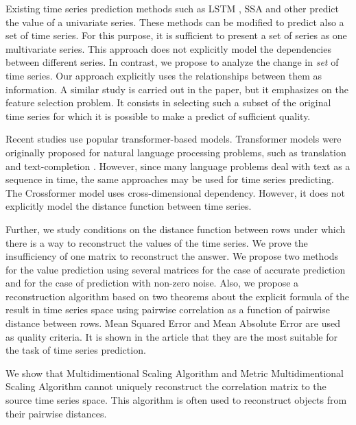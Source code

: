\documentclass[12pt]{article}
\begin{document}
	Existing time series prediction methods such as LSTM \cite{LSTM}, SSA \cite{SSA} and other \cite{Biosignals, boyd2017multiperiod} predict the value of a univariate series. These methods can be modified to predict also a set of time series. For this purpose, it is sufficient to present a set of series as one multivariate series. This approach does not explicitly model the dependencies between different series. In contrast, we propose to analyze the change in \emph{set} of time series. Our approach explicitly uses the relationships between them as information. A similar study is carried out in the \cite{MulticorrelatedQuadratic} paper, but it emphasizes on the feature selection problem. It consists in selecting such a subset of the original time series for which it is possible to make a predict of sufficient quality.
	
	Recent studies \cite{haoyietal-informer-2021,haoyietal-informerEx-2023,wu2021autoformer,liu2022pyraformer} use popular transformer-based models. Transformer models were originally proposed for natural language processing problems, such as translation and text-completion \cite{NIPS2017_3f5ee243}. However, since many language problems deal with text as a sequence in time, the same approaches may be used for time series predicting. The Crossformer model \cite{zhang2023crossformer} uses cross-dimensional dependency.  However, it does not explicitly model the distance function between time series.
	
	Further, we study conditions on the distance function between rows under which there is a way to reconstruct the values of the time series. We prove the insufficiency of one matrix to reconstruct the answer. We propose two methods for the value prediction using several matrices for the case of accurate prediction and for the case of prediction with non-zero noise. Also, we propose a reconstruction algorithm based on two theorems about the explicit formula of the result in time series space using pairwise correlation as a function of pairwise distance between rows. Mean Squared Error and Mean Absolute Error are used as quality criteria. It is shown in the article \cite{jadon2022comprehensive} that they are the most suitable for the task of time series prediction.
	
	We show that Multidimentional Scaling Algorithm \cite{MDS} and Metric Multidimentional Scaling Algorithm \cite{inbook} cannot uniquely reconstruct the correlation matrix to the source time series space. This algorithm is often used to reconstruct objects from their pairwise distances.
	
\end{document}
